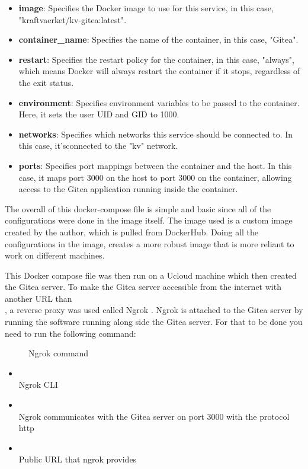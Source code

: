 \begin{itemize}
    \item \textbf{image}: Specifies the Docker image to use for this service, in this case, "kraftvaerket/kv-gitea:latest".
    \item \textbf{container\_name}: Specifies the name of the container, in this case, "Gitea".
    \item \textbf{restart}: Specifies the restart policy for the container, in this case, "always", which means Docker will always restart the container if it stops, regardless of the exit status.
    \item \textbf{environment}: Specifies environment variables to be passed to the container. Here, it sets the user UID and GID to 1000.
    \item \textbf{networks}: Specifies which networks this service should be connected to. In this case, it'sconnected to the "kv" network.
    \item \textbf{ports}: Specifies port mappings between the container and the host. In this case, it maps port 3000 on the host to port 3000 on the container, allowing access to the Gitea application running inside the container.
\end{itemize}
The overall of this docker-compose file is simple and basic since all of the configurations were done in the image itself.
The image used is a custom image created by the author, which 
is pulled from DockerHub. Doing all the configurations 
in the image, creates a more robust image that is more reliant to work on different machines.

This Docker compose file was then run on a \ac{Ucloud} machine which then created the Gitea server. 
To make the Gitea server accessible from the internet with another \ac{URL} than \\
, a reverse proxy was used called Ngrok \cite{ngrok}.
Ngrok is attached to the Gitea server by running the software running along side the Gitea server.
For that to be done you need to run the following command:
\begin{figure}[h]
    \begin{center}
    \end{center}
    \caption{Ngrok command}
    \label{fig:ngrok-command} 
\end{figure}

\begin{itemize}
    \item
    \\Ngrok CLI \\
    \item 
     \\Ngrok communicates with the Gitea server on port 3000 with the protocol http\\
    \item
    \\Public \ac{URL} that ngrok provides
\end{itemize}

